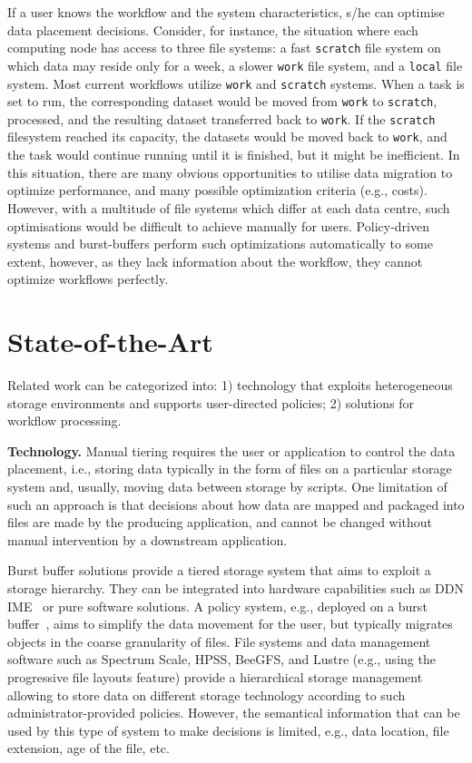 \documentclass{superfri}
\begin{document}
If a user knows the workflow and the system characteristics, s/he can optimise data placement decisions.
Consider, for instance, the situation where each computing node has access to three file systems: a fast \texttt{scratch} file system on which data may reside only for a week, a slower \texttt{work} file system, and a \texttt{local} file system.
Most current workflows utilize \texttt{work} and \texttt{scratch} systems.
When a task is set to run, the corresponding dataset would be moved from \texttt{work} to \texttt{scratch}, processed, and the resulting dataset transferred back to \texttt{work}.
If the \texttt{scratch} filesystem reached its capacity, the datasets would be moved back to \texttt{work}, and the task would continue running until it is finished, but it might be inefficient. %
In this situation, there are many obvious opportunities to utilise data migration to optimize performance, and many possible optimization criteria (e.g., costs).
However, with a multitude of file systems which differ at each data centre, such optimisations would be difficult to achieve manually for users.
Policy-driven systems and burst-buffers perform such optimizations automatically to some extent, however, as they lack information about the workflow, they cannot optimize workflows perfectly.

\section{State-of-the-Art}

Related work can be categorized into:
1) technology that exploits heterogeneous storage environments and supports user-directed policies;
2) solutions for workflow processing.

\textbf{Technology.}
Manual tiering requires the user or application to control the data placement, i.e., storing data typically in the form of files on a particular storage system and, usually, moving data between storage by scripts.
One limitation of such an approach is that decisions about how data are mapped and packaged into files are made by the producing application, and cannot be changed without manual intervention by a downstream application.

Burst buffer solutions provide a tiered storage system that aims to exploit a storage hierarchy.
They can be integrated into hardware capabilities such as DDN IME~\cite{BODIAIFSFI19} or pure software solutions.
A policy system, e.g., deployed on a burst buffer~\cite{RomanusRP15}, aims to simplify the data movement for the user, but typically migrates objects in the coarse granularity of files.
File systems and data management software such as Spectrum Scale, HPSS, BeeGFS, and Lustre (e.g., using the progressive file layouts feature) provide a hierarchical storage management allowing to store data on different storage technology according to such administrator-provided policies.
However, the semantical information that can be used by this type of system to make decisions is limited, e.g., data location, file extension, age of the file, etc.
\end{document}
